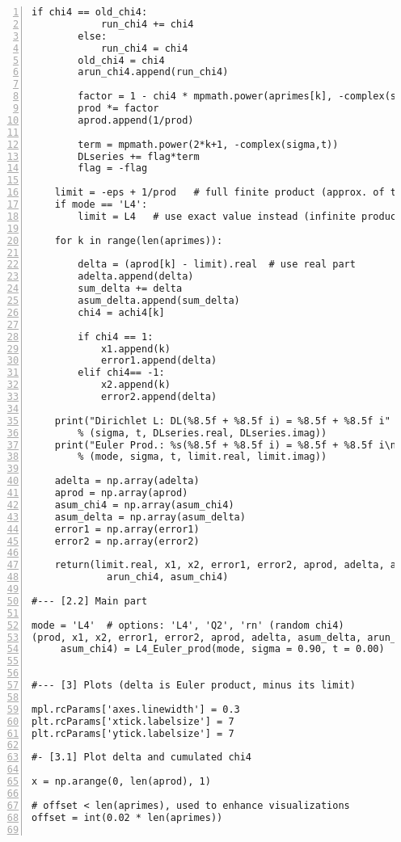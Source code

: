 \documentclass[oneside,10pt]{book}
\begin{document}
\begin{lstlisting}[numbers=left]
        if chi4 == old_chi4:
            run_chi4 += chi4
        else:
            run_chi4 = chi4
        old_chi4 = chi4
        arun_chi4.append(run_chi4) 
 
        factor = 1 - chi4 * mpmath.power(aprimes[k], -complex(sigma,t))
        prod *= factor
        aprod.append(1/prod)    

        term = mpmath.power(2*k+1, -complex(sigma,t))
        DLseries += flag*term
        flag = -flag

    limit = -eps + 1/prod   # full finite product (approx. of the limit)
    if mode == 'L4':
        limit = L4   # use exact value instead (infinite product if it converges)
  
    for k in range(len(aprimes)): 

        delta = (aprod[k] - limit).real  # use real part
        adelta.append(delta)
        sum_delta += delta
        asum_delta.append(sum_delta)
        chi4 = achi4[k]
       
        if chi4 == 1: 
            x1.append(k)
            error1.append(delta)
        elif chi4== -1: 
            x2.append(k)
            error2.append(delta)

    print("Dirichlet L: DL(%8.5f + %8.5f i) = %8.5f + %8.5f i" 
        % (sigma, t, DLseries.real, DLseries.imag))
    print("Euler Prod.: %s(%8.5f + %8.5f i) = %8.5f + %8.5f i\n" 
        % (mode, sigma, t, limit.real, limit.imag))

    adelta = np.array(adelta)
    aprod = np.array(aprod)
    asum_chi4 = np.array(asum_chi4)  
    asum_delta = np.array(asum_delta) 
    error1 = np.array(error1)
    error2 = np.array(error2)

    return(limit.real, x1, x2, error1, error2, aprod, adelta, asum_delta, 
             arun_chi4, asum_chi4)

#--- [2.2] Main part
    
mode = 'L4'  # options: 'L4', 'Q2', 'rn' (random chi4)
(prod, x1, x2, error1, error2, aprod, adelta, asum_delta, arun_chi4, 
     asum_chi4) = L4_Euler_prod(mode, sigma = 0.90, t = 0.00)


#--- [3] Plots (delta is Euler product, minus its limit)

mpl.rcParams['axes.linewidth'] = 0.3
plt.rcParams['xtick.labelsize'] = 7
plt.rcParams['ytick.labelsize'] = 7

#- [3.1] Plot delta and cumulated chi4

x = np.arange(0, len(aprod), 1)

# offset < len(aprimes), used to enhance visualizations 
offset = int(0.02 * len(aprimes))  


\end{lstlisting}
\end{document}
